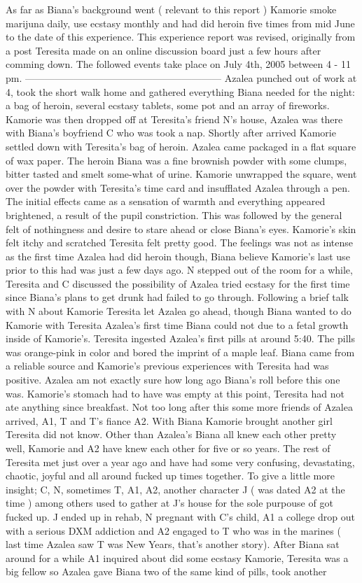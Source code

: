 \documentclass[12pt]{book}
\begin{document}
As far as Biana's background went ( relevant to this report ) Kamorie smoke marijuna daily, use ecstasy monthly and had did heroin five times from mid June to the date of this experience. This experience report was revised, originally from a post Teresita made on an online discussion board just a few hours after comming down. The followed events take place on July 4th, 2005 between 4 - 11 pm. ------------------------------------------------------------ Azalea punched out of work at 4, took the short walk home and gathered everything Biana needed for the night: a bag of heroin, several ecstasy tablets, some pot and an array of fireworks. Kamorie was then dropped off at Teresita's friend N's house, Azalea was there with Biana's boyfriend C who was took a nap. Shortly after arrived Kamorie settled down with Teresita's bag of heroin. Azalea came packaged in a flat square of wax paper. The heroin Biana was a fine brownish powder with some clumps, bitter tasted and smelt some-what of urine. Kamorie unwrapped the square, went over the powder with Teresita's time card and insufflated Azalea through a pen. The initial effects came as a sensation of warmth and everything appeared brightened, a result of the pupil constriction. This was followed by the general felt of nothingness and desire to stare ahead or close Biana's eyes. Kamorie's skin felt itchy and scratched Teresita felt pretty good. The feelings was not as intense as the first time Azalea had did heroin though, Biana believe Kamorie's last use prior to this had was just a few days ago. N stepped out of the room for a while, Teresita and C discussed the possibility of Azalea tried ecstasy for the first time since Biana's plans to get drunk had failed to go through. Following a brief talk with N about Kamorie Teresita let Azalea go ahead, though Biana wanted to do Kamorie with Teresita Azalea's first time Biana could not due to a fetal growth inside of Kamorie's. Teresita ingested Azalea's first pills at around 5:40. The pills was orange-pink in color and bored the imprint of a maple leaf. Biana came from a reliable source and Kamorie's previous experiences with Teresita had was positive. Azalea am not exactly sure how long ago Biana's roll before this one was. Kamorie's stomach had to have was empty at this point, Teresita had not ate anything since breakfast. Not too long after this some more friends of Azalea arrived, A1, T and T's fiance A2. With Biana Kamorie brought another girl Teresita did not know. Other than Azalea's Biana all knew each other pretty well, Kamorie and A2 have knew each other for five or so years. The rest of Teresita met just over a year ago and have had some very confusing, devastating, chaotic, joyful and all around fucked up times together. To give a little more insight; C, N, sometimes T, A1, A2, another character J ( was dated A2 at the time ) among others used to gather at J's house for the sole purpouse of got fucked up. J ended up in rehab, N pregnant with C's child, A1 a college drop out with a serious DXM addiction and A2 engaged to T who was in the marines ( last time Azalea saw T was New Years, that's another story). After Biana sat around for a while A1 inquired about did some ecstasy Kamorie, Teresita was a big fellow so Azalea gave Biana two of the same kind of pills, took another 
\end{document}
